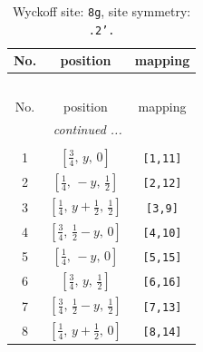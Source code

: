 \documentclass[fleqn,8pt]{jsarticle}
\begin{document}
\begin{longtable}{ccc}
\caption{Wyckoff site: {\tt 8g}, site symmetry: {\tt .2'.}}
 \\
 \hline \hline
No. & position & mapping \\ \hline \endfirsthead

\multicolumn{2}{l}{\tablename\ \thetable{}} \\
 \hline \hline
No. & position & mapping \\ \hline \endhead

 \hline \hline
\multicolumn{2}{r}{\footnotesize\it continued ...} \\ \endfoot

 \hline \hline
\multicolumn{2}{r}{} \\ \endlastfoot

1 & $\left[ \frac{3}{4},\, y,\, 0 \right]$ & {\tt [1,11]} \\ \hline
2 & $\left[ \frac{1}{4},\, - y,\, \frac{1}{2} \right]$ & {\tt [2,12]} \\ \hline
3 & $\left[ \frac{1}{4},\, y + \frac{1}{2},\, \frac{1}{2} \right]$ & {\tt [3,9]} \\ \hline
4 & $\left[ \frac{3}{4},\, \frac{1}{2} - y,\, 0 \right]$ & {\tt [4,10]} \\ \hline
5 & $\left[ \frac{1}{4},\, - y,\, 0 \right]$ & {\tt [5,15]} \\ \hline
6 & $\left[ \frac{3}{4},\, y,\, \frac{1}{2} \right]$ & {\tt [6,16]} \\ \hline
7 & $\left[ \frac{3}{4},\, \frac{1}{2} - y,\, \frac{1}{2} \right]$ & {\tt [7,13]} \\ \hline
8 & $\left[ \frac{1}{4},\, y + \frac{1}{2},\, 0 \right]$ & {\tt [8,14]} \\
\end{longtable}
\renewcommand{\arraystretch}{1.2}
\end{document}
